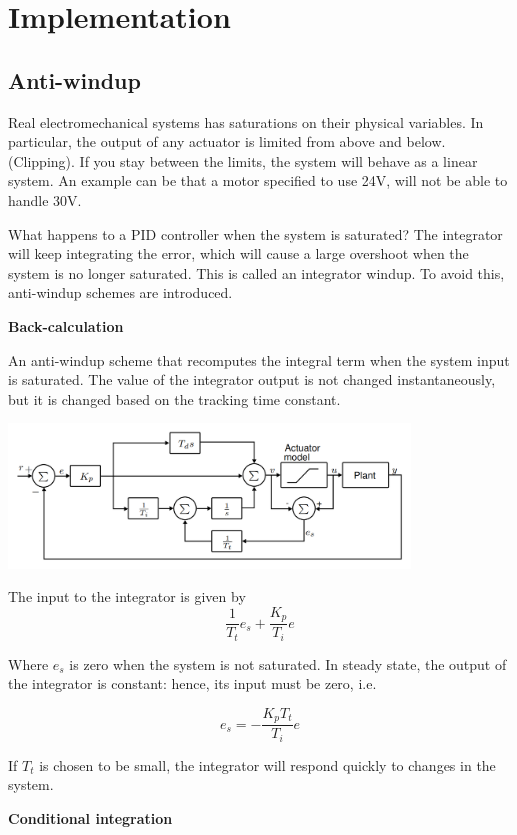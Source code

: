 \section{Implementation}

\subsection{Anti-windup}

Real electromechanical systems has saturations on their physical variables. In particular,
the output of any actuator is limited from above and below. (Clipping).
If you stay between the limits, the system will behave as a linear system. An example can be that
a motor specified to use 24V, will not be able to handle 30V.

What happens to a PID controller when the system is saturated? The integrator will keep integrating
the error, which will cause a large overshoot when the system is no longer saturated. This is called
an integrator windup. To avoid this, anti-windup schemes are introduced.


\textbf{Back-calculation}

An anti-windup scheme that recomputes the integral term when the system
input is saturated. The value of the integrator output is not changed instantaneously, but it is changed
based on the tracking time constant.

\begin{center}
	\includegraphics[width = 0.8\textwidth]{Images/backCalc.png}
\end{center}

The input to the integrator is given by
$$ \frac{1}{T_t}e_s  + \frac{K_p}{T_i}e $$

Where $e_s$ is zero when the system is not saturated. In steady state, the output of the integrator is constant:
hence, its input must be zero, i.e.

$$ e_s = -\frac{K_p T_t}{T_i}e $$

If $T_t$ is chosen to be small, the integrator will respond quickly to changes in the system.

\textbf{Conditional integration}

